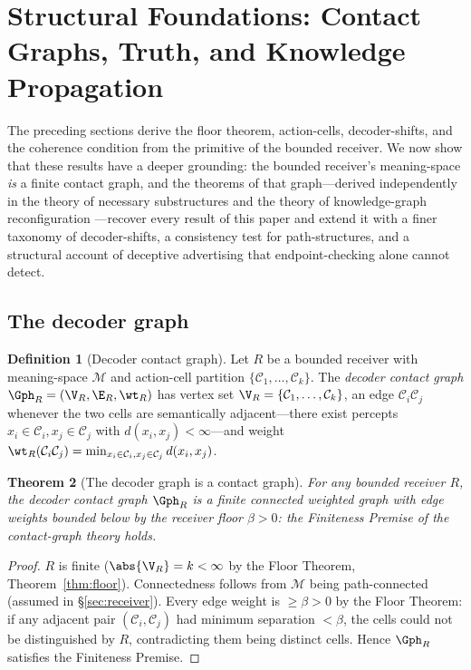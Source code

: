 \documentclass[twocolumn,11pt,a4paper]{article}
\theoremstyle{adv}
\newtheorem{theorem}{Theorem}[section]
\theoremstyle{definition}
\newtheorem{definition}[theorem]{Definition}
\theoremstyle{remark}
\newcommand{\Cell}{\mathcal{C}}        %
\newcommand{\Recv}{R}                  %
\newcommand{\floor}{\beta}            %
\newcommand{\Mean}{\mathcal{M}}        %
\newcommand{\dist}{d}
\begin{document}
\section{Structural Foundations: Contact Graphs, Truth, and Knowledge Propagation}
\label{sec:foundations}

The preceding sections derive the floor theorem, action-cells, decoder-shifts,
and the coherence condition from the primitive of the bounded receiver. We now
show that these results have a deeper grounding: the bounded receiver's
meaning-space \emph{is} a finite contact graph, and the theorems of that
graph---derived independently in the theory of necessary substructures
\citep{sachikonye2025contact} and the theory of knowledge-graph reconfiguration
\citep{sachikonye2025knowledge}---recover every result of this paper and extend
it with a finer taxonomy of decoder-shifts, a consistency test for
path-structures, and a structural account of deceptive advertising that
endpoint-checking alone cannot detect.

\subsection{The decoder graph}

\begin{definition}[Decoder contact graph]
\label{def:decoder-contact}
Let $\Recv$ be a bounded receiver with meaning-space $\Mean$ and action-cell
partition $\{\Cell_1,\dots,\Cell_k\}$. The \emph{decoder contact graph}
$\Gph_\Recv=(\V_\Recv,\E_\Recv,\wt_\Recv)$ has vertex set
$\V_\Recv=\{\Cell_1,\dots,\Cell_k\}$, an edge $\Cell_i\Cell_j$ whenever the
two cells are semantically adjacent---there exist percepts $x_i\in\Cell_i,
x_j\in\Cell_j$ with $\dist(x_i,x_j)<\infty$---and weight
$\wt_\Recv(\Cell_i\Cell_j)=\min_{x_i\in\Cell_i,x_j\in\Cell_j}\dist(x_i,x_j)$.
\end{definition}

\begin{theorem}[The decoder graph is a contact graph]
\label{thm:decoder-contact}
For any bounded receiver $\Recv$, the decoder contact graph $\Gph_\Recv$ is a
finite connected weighted graph with edge weights bounded below by the receiver
floor $\floor>0$: the Finiteness Premise of the contact-graph theory holds.
\end{theorem}

\begin{proof}
$\Recv$ is finite ($\abs{\V_\Recv}=k<\infty$ by the Floor Theorem,
Theorem~\ref{thm:floor}). Connectedness follows from $\Mean$ being path-connected
(assumed in \S\ref{sec:receiver}). Every edge weight is $\ge\floor>0$ by the
Floor Theorem: if any adjacent pair $(\Cell_i,\Cell_j)$ had minimum separation
$<\floor$, the cells could not be distinguished by $\Recv$, contradicting
them being distinct cells. Hence $\Gph_\Recv$ satisfies the Finiteness Premise.
\end{proof}
\end{document}

